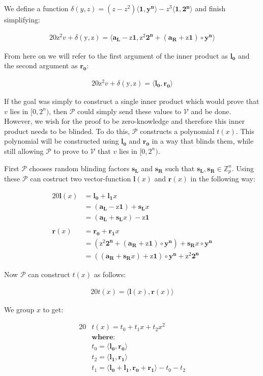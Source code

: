 \documentclass{article}
\newcommand{\eq}[1]{\begin{alignat*}{20}#1\end{alignat*}}
\renewcommand{\vec}[1]{\boldsymbol{#1}}
\newcommand{\ran}[1]{\mathrm{#1}}
\newcommand{\vecran}[1]{\mathbf{#1}}
\newcommand{\V}{\mathcal{V}}
\renewcommand{\P}{\mathcal{P}}
\newcommand{\Z}{\mathbb{Z}}
\newcommand{\dotp}[2]{\langle #1, #2 \rangle}
\newcommand{\opn}[1]{\operatorname{#1}}
\newcommand{\vecl}[1]{\vec{#1_{\opn{L}}}}
\newcommand{\vecr}[1]{\vec{#1_{\opn{R}}}}
\begin{document}
We define a function $\delta(y,z) = (z - z^2)\dotp{\vec{1}}{\vec{y^n}}
- z^3\dotp{\vec{1}}{\vec{2^n}}$ and finish simplifying:

\eq{
	\ran{z^2}v + \delta(\ran{y},\ran{z}) = \dotp{\vecl{a} - \ran{z}\vec{1}}{\ran{z^2}\vec{2^n} + (\vecr{a} + \ran{z}\vec{1})\circ\vecran{y^n}}
}

From here on we will refer to the first argument of the inner product
as $\vec{l_0}$ and the second argument as $\vec{r_0}$:

\eq{
	\ran{z^2}v + \delta(\ran{y},\ran{z}) = \dotp{\vec{l_0}}{\vec{r_0}}
}

If the goal was simply to construct a single inner product which
would prove that $v$ lies in $[0,2^n)$, then $\P$ could simply send
these values to $\V$ and be done. However, we wish for the proof to be
zero-knowledge and therefore this inner product needs to be blinded. To
do this, $\P$ constructs a polynomial $t(x)$. This polynomial will
be constructed using $\vec{l_0}$ and $\vec{r_0}$ in a way that blinds
them, while still allowing $\P$ to prove to $\V$ that $v$ lies in
$[0,2^n)$.

First $\P$ chooses random blinding factors $\vecran{s_L}$ and
$\vecran{s_R}$ such that $\vecl{s},\vecr{s}\in \Z^n_p$. Using these
$\P$ can costruct two vector-function $\vec{l}(x)$ and $\vec{r}(x)$
in the following way:

\eq{
	\vec{l}(x) &= \vec{l_0} + \vec{l_1}x \\ &= (\vecl{a} - \ran{z}\vec{1}) + \vecl{s}x \\ &= (\vecl{a} + \vecl{s}x) - \ran{z}\vec{1}\\&\\
	\vec{r}(x) &= \vec{r_0} + \vec{r_1}x \\ &= (\ran{z^2}\vec{2^n} + (\vecr{a} + \ran{z}\vec{1})\circ\vecran{y^n}) + \vecr{s}x\circ\vecran{y^n} \\ &= ((\vecr{a} + \vecr{s}x) + \ran{z}\vec{1}) \circ \vecran{y^n} + \ran{z}^2\vec{2^n}
}

Now $\P$ can construct $t(x)$ as follows:

\eq{
	t(x) = \dotp{\vec{l}(x)}{\vec{r}(x)}
}

We group $x$ to get:

\eq{
	&t(x) = t_0 + t_1x + t_2x^2 \\
	&\textbf{where:} \\
	&t_0 = \dotp{\vec{l_0}}{\vec{r_0}}\\
	&t_2 = \dotp{\vec{l_1}}{\vec{r_1}}\\
	&t_1 = \dotp{\vec{l_0}+\vec{l_1}}{\vec{r_0} + \vec{r_1}} - t_0 - t_2
}
\end{document}
